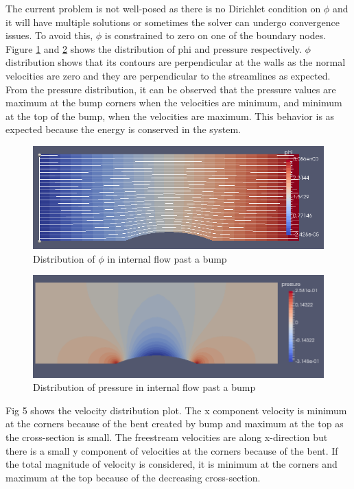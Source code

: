 \documentclass[12pt]{elsarticle}
\begin{document}
	The current problem is not well-posed as there is no Dirichlet condition on $\phi$ and it will have multiple solutions or sometimes the solver can undergo convergence issues. To avoid this, $\phi$  is constrained to zero on one of the boundary nodes.\\
	Figure \ref{bum_phi} and \ref{bum_pres} shows the distribution of phi and pressure respectively. $\phi$ distribution shows that its contours are perpendicular at the walls as the normal velocities are zero and they are perpendicular to the streamlines as expected. From the pressure distribution, it can be observed that the pressure values are maximum at the bump corners when the velocities are minimum, and minimum at the top of the bump, when the velocities are maximum. This behavior is as expected because the energy is conserved in the system.
	
	\begin{figure}[h]\label{bum_phi}
		\centering\includegraphics[width=1.0\linewidth]{bum_phi}
		\caption{Distribution of $\phi$ in internal flow past a bump}
	\end{figure}
	
	\begin{figure}[h]\label{bum_pres}
		\centering\includegraphics[width=1.0\linewidth]{bum_pres}
		\caption{Distribution of pressure in internal flow past a bump}
	\end{figure}
	
	Fig 5 shows the velocity distribution plot. The x component velocity is minimum at the corners because of the bent created by bump and maximum at the top as the cross-section is small. The freestream velocities are along x-direction but there is a small y component of velocities at the corners because of the bent. If the total magnitude of velocity is considered, it is minimum at the corners and maximum at the top because of the decreasing cross-section.
	
\end{document}
